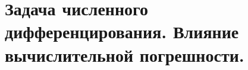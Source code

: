 \documentclass[../../calc-math-exam-2023.tex]{subfiles}
\begin{document}
    \section{Задача численного дифференцирования. Влияние вычислительной погрешности.}\label{sec:ch12}
\end{document}
